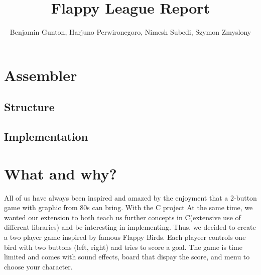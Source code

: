 \documentclass[11pt]{article}
\begin{document}
\title{Flappy League Report}
\author{Benjamin Gunton, Harjuno Perwironegoro, Nimesh Subedi, Szymon Zmyslony}

\maketitle
\section{Assembler}
\subsection{Structure}
\subsection{Implementation}
\section{What and why?}
All of us have always been inspired and amazed by the enjoyment that a 2-button game with graphic from 80s can bring. With the C project At the same time, we wanted our extension to both teach us further concepts in C(extensive use of different libraries) and be interesting in implementing. Thus, we decided to create a two player game inspired by famous Flappy Birds. Each playeer controls one bird with two buttons (left, right) and tries to score a goal. The game is time limited and comes with sound effects, board that dispay the score, and menu to choose your character.
\end{document}
